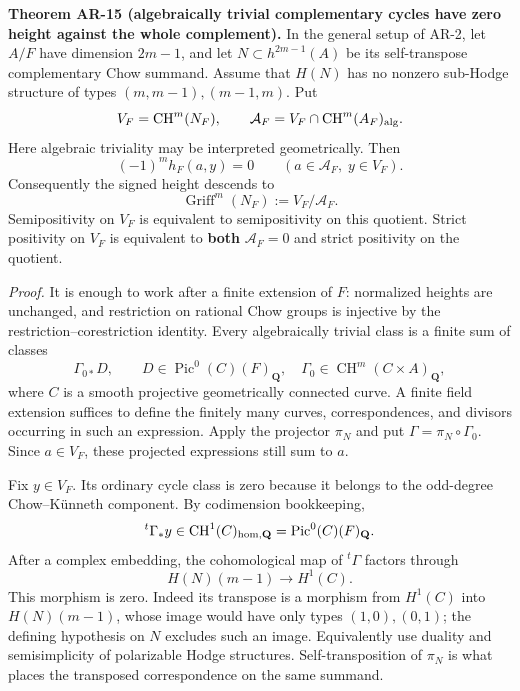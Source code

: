 \textbf{Theorem AR-15 (algebraically trivial complementary cycles have
zero height against the whole complement).} In the general setup of
AR-2, let \(A/F\) have dimension \(2m-1\), and let
\(N\subset h^{2m-1}(A)\) be its self-transpose complementary Chow
summand. Assume that \(H(N)\) has no nonzero sub-Hodge structure of
types \((m,m-1),(m-1,m)\). Put \[
V_F=\operatorname{CH}^m(N_F),\qquad
\mathcal A_F=V_F\cap\operatorname{CH}^m(A_F)_{\rm alg}.
\] Here algebraic triviality may be interpreted geometrically. Then \[
(-1)^m h_F(a,y)=0
\qquad(a\in\mathcal A_F,\;y\in V_F).
\tag{AR15.3}
\] Consequently the signed height descends to \[
\operatorname{Griff}^m(N_F):=V_F/\mathcal A_F.
\tag{AR15.4}
\] Semipositivity on \(V_F\) is equivalent to semipositivity on this
quotient. Strict positivity on \(V_F\) is equivalent to \textbf{both}
\(\mathcal A_F=0\) and strict positivity on the quotient.

\emph{Proof.} It is enough to work after a finite extension of \(F\):
normalized heights are unchanged, and restriction on rational Chow
groups is injective by the restriction--corestriction identity. Every
algebraically trivial class is a finite sum of classes \[
\Gamma_{0*}D,
\qquad D\in\operatorname{Pic}^0(C)(F)_{\mathbf Q},
\quad\Gamma_0\in\operatorname{CH}^m(C\times A)_{\mathbf Q},
\] where \(C\) is a smooth projective geometrically connected curve. A
finite field extension suffices to define the finitely many curves,
correspondences, and divisors occurring in such an expression. Apply the
projector \(\pi_N\) and put \(\Gamma=\pi_N\circ\Gamma_0\). Since
\(a\in V_F\), these projected expressions still sum to \(a\).

Fix \(y\in V_F\). Its ordinary cycle class is zero because it belongs to
the odd-degree Chow--Künneth component. By codimension bookkeeping, \[
{}^t\Gamma_*y\in\operatorname{CH}^1(C)_{\rm hom,\mathbf Q}
                   =\operatorname{Pic}^0(C)(F)_{\mathbf Q}.
\] After a complex embedding, the cohomological map of \({}^t\Gamma\)
factors through \[
H(N)(m-1)\longrightarrow H^1(C).
\] This morphism is zero. Indeed its transpose is a morphism from
\(H^1(C)\) into \(H(N)(m-1)\), whose image would have only types
\((1,0),(0,1)\); the defining hypothesis on \(N\) excludes such an
image. Equivalently use duality and semisimplicity of polarizable Hodge
structures. Self-transposition of \(\pi_N\) is what places the
transposed correspondence on the same summand.

